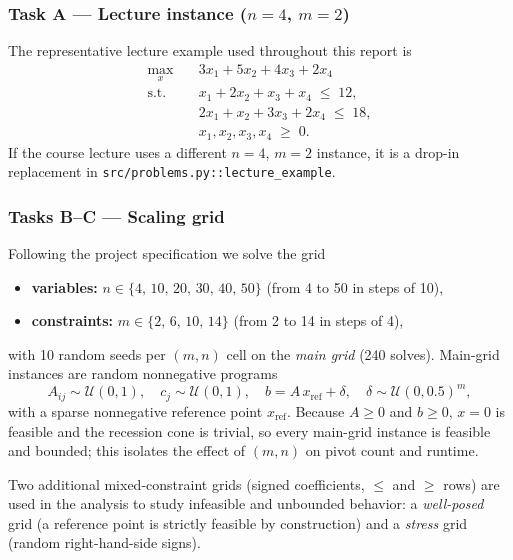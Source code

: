 \documentclass[10pt]{article}
\begin{document}
\subsubsection*{Task A --- Lecture instance ($n=4$, $m=2$)}
The representative lecture example used throughout this report is
\begin{equation}
\label{eq:lecture}
\begin{aligned}
\max_{x}\quad & 3x_1 + 5x_2 + 4x_3 + 2x_4 \\
\text{s.t.}\quad
& x_1 + 2x_2 + x_3 + x_4 \;\le\; 12,\\
& 2x_1 + x_2 + 3x_3 + 2x_4 \;\le\; 18,\\
& x_1,x_2,x_3,x_4 \;\ge\; 0.
\end{aligned}
\end{equation}
If the course lecture uses a different $n=4$, $m=2$ instance, it is a
drop-in replacement in \texttt{src/problems.py::lecture\_example}.

\subsubsection*{Tasks B--C --- Scaling grid}
Following the project specification we solve the grid
\begin{itemize}[nosep]
  \item \textbf{variables:} $n \in \{4,\,10,\,20,\,30,\,40,\,50\}$
        (from 4 to 50 in steps of 10),
  \item \textbf{constraints:} $m \in \{2,\,6,\,10,\,14\}$
        (from 2 to 14 in steps of 4),
\end{itemize}
with 10 random seeds per $(m,n)$ cell on the \emph{main grid}
(240 solves).  Main-grid instances are random nonnegative programs
\begin{equation}
\label{eq:random}
A_{ij} \sim \mathcal{U}(0,1),\quad
c_j \sim \mathcal{U}(0,1),\quad
b = A\, x_{\mathrm{ref}} + \delta,\quad
\delta \sim \mathcal{U}(0,0.5)^m,
\end{equation}
with a sparse nonnegative reference point $x_{\mathrm{ref}}$.  Because
$A\ge 0$ and $b \ge 0$, $x=0$ is feasible and the recession cone is
trivial, so every main-grid instance is feasible and bounded; this isolates
the effect of $(m,n)$ on pivot count and runtime.

Two additional mixed-constraint grids (signed coefficients, $\le$ and $\ge$
rows) are used in the analysis to study infeasible and unbounded behavior:
a \emph{well-posed} grid (a reference point is strictly feasible by
construction) and a \emph{stress} grid (random right-hand-side signs).
\end{document}
